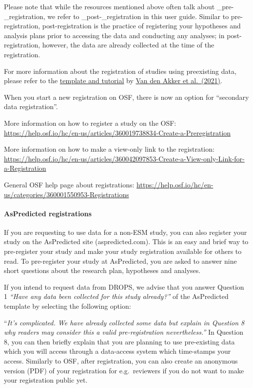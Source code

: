 \documentclass[
]{article}
\begin{document}
Please note that while the resources mentioned above often talk about
\_pre-\_registration, we refer to \_post-\_registration in this user
guide. Similar to pre-registration, post-registration is the practice of
registering your hypotheses and analysis plans prior to accessing the
data and conducting any analyses; in post-registration, however, the
data are already collected at the time of the registration.

For more information about the registration of studies using preexisting
data, please refer to the
\href{https://open.lnu.se/index.php/metapsychology/article/view/2625}{template
and tutorial} by \href{https://www.zotero.org/google-docs/?wZgHX5}{Van
den Akker et al.~(2021)}.

When you start a new registration on OSF, there is now an option for
``secondary data registration''.

More information on how to register a study on the OSF:
\url{https://help.osf.io/hc/en-us/articles/360019738834-Create-a-Preregistration}

More information on how to make a view-only link to the registration:
\url{https://help.osf.io/hc/en-us/articles/360042097853-Create-a-View-only-Link-for-a-Registration}

General OSF help page about registrations:
\url{https://help.osf.io/hc/en-us/categories/360001550953-Registrations}

\hypertarget{aspredicted-registrations}{%
\paragraph{AsPredicted registrations}\label{aspredicted-registrations}}

If you are requesting to use data for a non-ESM study, you can also
register your study on the AsPredicted site (aspredicted.com). This is
an easy and brief way to pre-register your study and make your study
registration available for others to read. To pre-register your study at
AsPredicted, you are asked to answer nine short questions about the
research plan, hypotheses and analyses.

If you intend to request data from DROPS, we advise that you answer
Question 1 \emph{``Have any data been collected for this study
already?''} of the AsPredicted template by selecting the following
option:

``\emph{It's complicated. We have already collected some data but
explain in Question 8 why readers may consider this a valid
pre-registration nevertheless.''} In Question 8, you can then briefly
explain that you are planning to use pre-existing data which you will
access through a data-access system which time-stamps your access.
Similarly to OSF, after registration, you can also create an anonymous
version (PDF) of your registration for e.g.~reviewers if you do not want
to make your registration public yet.
\end{document}
